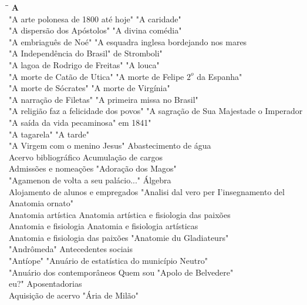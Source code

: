 \begin{tabbing}
	\hspace{8,7cm}\=\hspace{1cm}\=\kill
	\textbf{A} \>  \\ 
	"A arte polonesa de 1800 até hoje"	\> "A caridade"\\
	"A dispersão dos Apóstolos" \> "A divina comédia"\\
	"A embriaguês de Noé" \> "A esquadra inglesa bordejando nos mares\\
	"A Independência do Brasil" \> de Stromboli"\\ 
	"A lagoa de Rodrigo de Freitas" \>  "A louca"\\ 
	"A morte de Catão de Utica" \> "A morte de Felipe $2^o$ da Espanha"\\ 
	"A morte de Sócrates" \> "A morte de Virgínia"\\
	"A narração de Filetas" \> "A primeira missa no Brasil" \\
	"A religião faz a felicidade dos povos" \> "A sagração de Sua Majestade o Imperador \\ 
	"A saída da vida pecaminosa"	\> em 1841" \\ 
	"A tagarela" \> "A tarde"\\
	"A Virgem com o menino Jesus"  \> Abastecimento de água\\
	Acervo bibliográfico  \> Acumulação de cargos\\
	Admissões e nomeações  \> "Adoração dos Magos"\\
	"Agamenon de volta a seu palácio..." \> Álgebra \\ 
	Alojamento de alunos e empregados	\> "Analisi dal vero per I'insegnamento del \\ 
	Anatomia \> ornato"\\
	Anatomia artística  \> Anatomia artística e fisiologia das paixões\\
	Anatomia e fisiologia  \> Anatomia e fisiologia artísticas\\
	Anatomia e fisiologia das paixões  \> "Anatomie du Gladiateurs"\\
	"Andrômeda" \> Antecedentes sociais \\ 
	"Antíope"	\> "Anuário de estatística do município Neutro" \\ 
	"Anuário dos contemporâneos Quem sou \> "Apolo de Belvedere"\\
	eu?"  \> Aposentadorias\\
	Aquisição de acervo  \> "Ária de Milão"\\

\end{tabbing}
